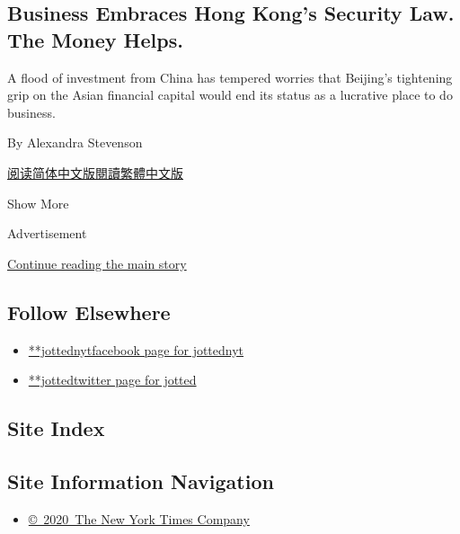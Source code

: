 \begin{enumerate}
  \hypertarget{business-embraces-hong-kongs-security-law-the-money-helps}{%
  \subsection{Business Embraces Hong Kong's Security Law. The Money
  Helps.}\label{business-embraces-hong-kongs-security-law-the-money-helps}}

  A flood of investment from China has tempered worries that Beijing's
  tightening grip on the Asian financial capital would end its status as
  a lucrative place to do business.

  By Alexandra Stevenson

  \href{https://cn.nytimes3xbfgragh.onion/business/20200630/china-hong-kong-security-law-business/}{阅读简体中文版}\href{https://cn.nytimes3xbfgragh.onion/business/20200630/china-hong-kong-security-law-business/zh-hant/}{閱讀繁體中文版}
\end{enumerate}

Show More

Advertisement

\protect\hyperlink{after-mid2}{Continue reading the main story}

\hypertarget{follow-elsewhere}{%
\subsection{Follow Elsewhere}\label{follow-elsewhere}}

\begin{itemize}
\tightlist
\item
  \href{https://www.facebookcorewwwi.onion/jottednyt}{**jottednytfacebook
  page for jottednyt}
\item
  \href{https://twitter.com/jotted}{**jottedtwitter page for jotted}
\end{itemize}

\hypertarget{site-index}{%
\subsection{Site Index}\label{site-index}}

\hypertarget{site-information-navigation}{%
\subsection{Site Information
Navigation}\label{site-information-navigation}}

\begin{itemize}
\tightlist
\item
  \href{https://help.nytimes3xbfgragh.onion/hc/en-us/articles/115014792127-Copyright-notice}{©~2020~The
  New York Times Company}
\end{itemize}

